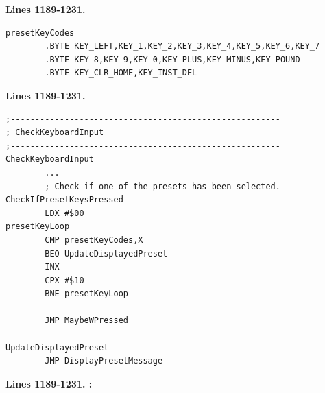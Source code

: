 \clearpage
\textbf{Lines 1189-1231. } 
\begin{lstlisting}
presetKeyCodes
        .BYTE KEY_LEFT,KEY_1,KEY_2,KEY_3,KEY_4,KEY_5,KEY_6,KEY_7
        .BYTE KEY_8,KEY_9,KEY_0,KEY_PLUS,KEY_MINUS,KEY_POUND
        .BYTE KEY_CLR_HOME,KEY_INST_DEL
\end{lstlisting}
\textbf{Lines 1189-1231. } 
\begin{lstlisting}
;-------------------------------------------------------
; CheckKeyboardInput
;-------------------------------------------------------
CheckKeyboardInput   
        ...
        ; Check if one of the presets has been selected.
CheckIfPresetKeysPressed   
        LDX #$00
presetKeyLoop   
        CMP presetKeyCodes,X
        BEQ UpdateDisplayedPreset
        INX 
        CPX #$10
        BNE presetKeyLoop

        JMP MaybeWPressed

UpdateDisplayedPreset   
        JMP DisplayPresetMessage
\end{lstlisting}

\clearpage

\textbf{Lines 1189-1231. :} 
\clearpage


